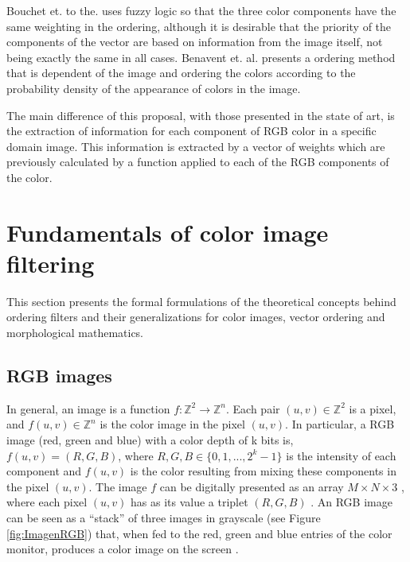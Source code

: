 Bouchet et. to the. \cite{bouchet2016fuzzy} uses fuzzy logic so that the three color components have the same weighting in the ordering, although it is desirable that the priority of the components of the vector are based on information from the image itself, not being exactly the same in all cases. Benavent et. al. \cite{benavent2012mathematical} presents a ordering method that is dependent of the image and ordering the colors according to the probability density of the appearance of colors in the image.

The main difference of this proposal, with those presented in the state of art, is the extraction of information for each component of RGB color in a specific domain image. This information is extracted by a vector of weights which are previously calculated by a function applied to each of the RGB components of the color.

\section{Fundamentals of color image filtering}
\label{Teo}

This section presents the formal formulations of the theoretical concepts behind ordering filters and their generalizations for color images, vector ordering and morphological mathematics.

\subsection{RGB images}
In general, an image is a function $f:\mathbb{Z}^2 \rightarrow \mathbb{Z}^n$. Each pair $(u,v) \in \mathbb{Z}^2$ is a pixel, and $f(u,v) \in \mathbb Z^n $ is the color image in the pixel $(u,v)$. In particular, a RGB image (red, green and blue) with a color depth of k bits is, $f(u,v) = (R,G,B)$, where $R,G,B \in \{0,1,...,2^k-1\}$ is the intensity of each component and $f(u,v)$ is the color resulting from mixing these components in the pixel $(u,v)$. %
The image $f$ can be digitally presented as an array $M \times N \times 3$ , where each pixel $(u,v)$ has as its value a triplet $(R,G,B)$ \cite{gonzales2004digital}. An RGB image can be seen as a ``stack'' of three images in grayscale (see Figure \ref{fig:ImagenRGB}) that, when fed to the red, green and blue entries of the color monitor, produces a color image on the screen \cite{gonzales2004digital}.


